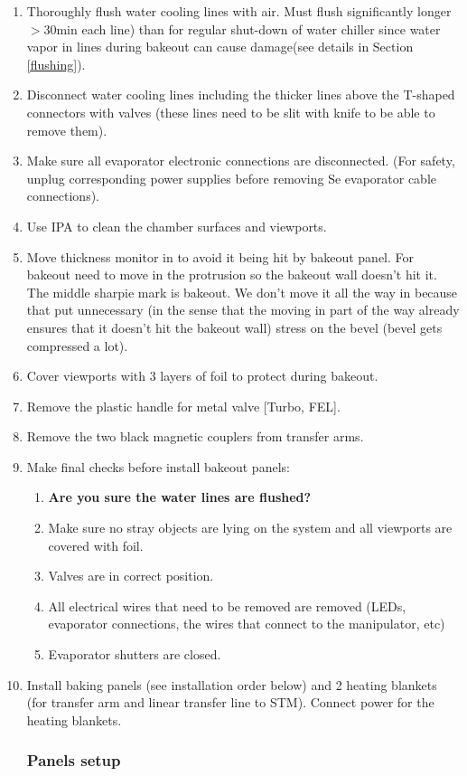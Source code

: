 \begin{enumerate}
\item	Thoroughly flush water cooling lines with air. Must flush significantly longer $>30$min each line) than for regular shut-down of water chiller since water vapor in lines during bakeout can cause damage(see details in Section \ref{flushing}).
\item	Disconnect water cooling lines including the thicker lines above the T-shaped connectors with valves (these lines need to be slit with knife to be able to remove them). 
\item	Make sure all evaporator electronic connections are disconnected. (For safety, unplug corresponding power supplies before removing Se evaporator cable connections). 
\item	Use IPA to clean the chamber surfaces and viewports.
\item	Move thickness monitor in to avoid it being hit by bakeout panel. For bakeout need to move in the protrusion so the bakeout wall doesn’t hit it. The middle sharpie mark is bakeout. We don’t move it all the way in because that put unnecessary (in the sense that the moving in part of the way already ensures that it doesn’t hit the bakeout wall) stress on the bevel (bevel gets compressed a lot).
\item	Cover viewports with 3 layers of foil to protect during bakeout.
\item	Remove the plastic handle for metal valve [Turbo, FEL].
\item   Remove the two black magnetic couplers from transfer arms. 
\item	Make final checks before install bakeout panels: 
\begin{enumerate}
	\item \textbf{Are you sure the water lines are flushed?}
	\item Make sure no stray objects are lying on the system and all viewports are covered with foil.
	\item Valves are in correct position.
	\item All electrical wires that need to be removed are removed (LEDs, evaporator connections, the wires that connect to the manipulator, etc)
	\item Evaporator shutters are closed.
\end{enumerate}
\item	Install baking panels (see installation order below) and 2 heating blankets (for transfer arm and linear transfer line to STM). Connect power for the heating blankets.
\subsubsection*{Panels setup}


\end{enumerate}
